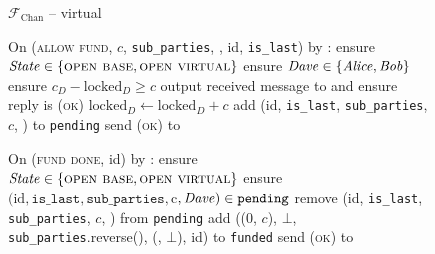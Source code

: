 \begin{figure}[H]
\begin{systembox}{$\mathcal{F}_{\mathrm{Chan}}$ -- virtual}
\begin{algorithmic}[1]
      \State On (\textsc{allow fund}, $c$, \texttt{sub\_parties}, \dave, id,
      \texttt{is\_last}) by \charlie:
      \label{code:functionality:chan:skeleton:virtual:allow-fund}
      \Indent
        \State ensure $\mathit{State} \in \{\textsc{open base}, \textsc{open
        virtual}\}$
        \State ensure $\mathit{Dave} \in \{\mathit{Alice}, \mathit{Bob}\}$
        \State ensure $c_D - \mathrm{locked}_D \geq c$
        \State output received message to \dave and ensure reply is
        \textsc{(ok)}
        \State $\mathrm{locked}_D \gets \mathrm{locked}_D + c$
        \State add (id, \texttt{is\_last}, \texttt{sub\_parties}, $c$, \dave) to
        \texttt{pending}
        \State send (\textsc{ok}) to \charlie
      \EndIndent
      \Statex

      \State On (\textsc{fund done}, id) by \charlie:
      \Indent
        \State ensure $\mathit{State} \in \{\textsc{open base}, \textsc{open
        virtual}\}$
        \State ensure $(\mathrm{id}, \mathtt{is\_last}, \mathtt{sub\_parties},
        $c$, \mathit{Dave}) \in \mathtt{pending}$
        \State remove (id, \texttt{is\_last}, \texttt{sub\_parties}, $c$, \dave)
        from \texttt{pending}
          \State add ((0, $c$), $\bot$, \texttt{sub\_parties}.reverse(),
          (\dave, $\bot$), id) to \texttt{funded}
        \EndIf
        \State send (\textsc{ok}) to \charlie
      \EndIndent
    \end{algorithmic}
  \end{systembox}
  \caption{}
  \label{code:functionality:chan:skeleton:virtual}
\end{figure}
